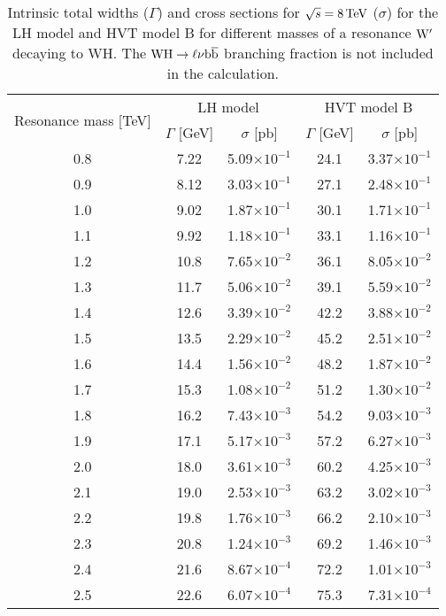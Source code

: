 \begin{table}[!htb]
\caption{
Intrinsic total widths ($\Gamma$) and cross sections for $\sqrt{s} = 8\,\text{Te\hspace{-.08em}V}$ ($\sigma$) for the LH model and HVT model B for different masses of a resonance $\mathrm{W}^\prime$ decaying to WH.
The $\mathrm{W}\mathrm{H}\to\ell\nu{\mathrm{b}\overline{\mathrm{b}}}$ branching fraction is not included in the calculation.
}
\label{tab:gamma_xsec_LH_HVT}
\begin{center}
\small
\begin{tabular}{c|cc|cc}
\multirow{2}{*}{{Resonance mass [TeV]}} & \multicolumn{2}{c}{{LH model}} & \multicolumn{2}{c}{{HVT model B}} \\
                 & $\Gamma$ [GeV] & $\sigma$ [pb] & $\Gamma$ [GeV] & $\sigma$ [pb] \\
\hline \hline
0.8 & 7.22 & 5.09$\times 10^{-1}$ & 24.1 & 3.37$\times 10^{-1}$ \\
0.9 & 8.12 & 3.03$\times 10^{-1}$ & 27.1 & 2.48$\times 10^{-1}$ \\
1.0 & 9.02 & 1.87$\times 10^{-1}$ & 30.1 & 1.71$\times 10^{-1}$ \\
1.1 & 9.92 & 1.18$\times 10^{-1}$ & 33.1 & 1.16$\times 10^{-1}$ \\
1.2 & 10.8 & 7.65$\times 10^{-2}$ & 36.1 & 8.05$\times 10^{-2}$ \\
1.3 & 11.7 & 5.06$\times 10^{-2}$ & 39.1 & 5.59$\times 10^{-2}$ \\
1.4 & 12.6 & 3.39$\times 10^{-2}$ & 42.2 & 3.88$\times 10^{-2}$ \\
1.5 & 13.5 & 2.29$\times 10^{-2}$ & 45.2 & 2.51$\times 10^{-2}$ \\
1.6 & 14.4 & 1.56$\times 10^{-2}$ & 48.2 & 1.87$\times 10^{-2}$ \\
1.7 & 15.3 & 1.08$\times 10^{-2}$ & 51.2 & 1.30$\times 10^{-2}$ \\
1.8 & 16.2 & 7.43$\times 10^{-3}$ & 54.2 & 9.03$\times 10^{-3}$ \\
1.9 & 17.1 & 5.17$\times 10^{-3}$ & 57.2 & 6.27$\times 10^{-3}$ \\
2.0 & 18.0 & 3.61$\times 10^{-3}$ & 60.2 & 4.25$\times 10^{-3}$ \\
2.1 & 19.0 & 2.53$\times 10^{-3}$ & 63.2 & 3.02$\times 10^{-3}$ \\
2.2 & 19.8 & 1.76$\times 10^{-3}$ & 66.2 & 2.10$\times 10^{-3}$ \\
2.3 & 20.8 & 1.24$\times 10^{-3}$ & 69.2 & 1.46$\times 10^{-3}$ \\
2.4 & 21.6 & 8.67$\times 10^{-4}$ & 72.2 & 1.01$\times 10^{-3}$ \\
2.5 & 22.6 & 6.07$\times 10^{-4}$ & 75.3 & 7.31$\times 10^{-4}$ 
\end{tabular}
\end{center}
\end{table}

